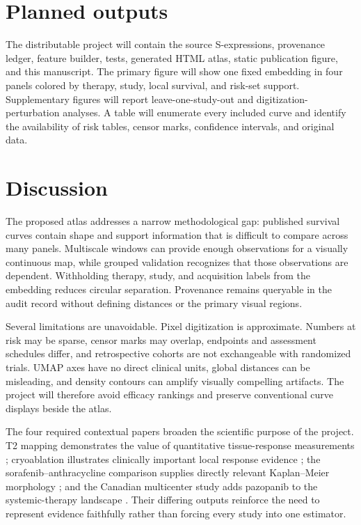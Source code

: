 \documentclass[17pt]{extarticle}
\begin{document}
\section{Planned outputs}

The distributable project will contain the source S-expressions, provenance ledger, feature builder, tests, generated HTML atlas, static publication figure, and this manuscript. The primary figure will show one fixed embedding in four panels colored by therapy, study, local survival, and risk-set support. Supplementary figures will report leave-one-study-out and digitization-perturbation analyses. A table will enumerate every included curve and identify the availability of risk tables, censor marks, confidence intervals, and original data.

\section{Discussion}

The proposed atlas addresses a narrow methodological gap: published survival curves contain shape and support information that is difficult to compare across many panels. Multiscale windows can provide enough observations for a visually continuous map, while grouped validation recognizes that those observations are dependent. Withholding therapy, study, and acquisition labels from the embedding reduces circular separation. Provenance remains queryable in the audit record without defining distances or the primary visual regions.

Several limitations are unavoidable. Pixel digitization is approximate. Numbers at risk may be sparse, censor marks may overlap, endpoints and assessment schedules differ, and retrospective cohorts are not exchangeable with randomized trials. UMAP axes have no direct clinical units, global distances can be misleading, and density contours can amplify visually compelling artifacts. The project will therefore avoid efficacy rankings and preserve conventional curve displays beside the atlas.

The four required contextual papers broaden the scientific purpose of the project. T2 mapping demonstrates the value of quantitative tissue-response measurements \citep{souza2023t2}; cryoablation illustrates clinically important local response evidence \citep{liu2022cryo}; the sorafenib--anthracycline comparison supplies directly relevant Kaplan--Meier morphology \citep{costa2025sorafenib}; and the Canadian multicenter study adds pazopanib to the systemic-therapy landscape \citep{noujaim2024realworld}. Their differing outputs reinforce the need to represent evidence faithfully rather than forcing every study into one estimator.
\end{document}
